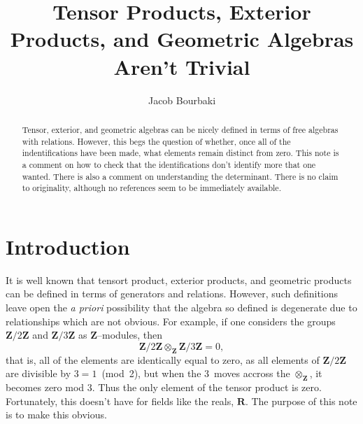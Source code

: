 \documentclass{article}
\title{Tensor Products, Exterior Products, and Geometric Algebras Aren't Trivial}
\author{Jacob Bourbaki}
\begin{document}
\maketitle
\doclicenseThis
\begin{abstract}
Tensor, exterior, and geometric algebras can be nicely defined in terms
of free algebras with relations.  However, this begs the question of whether, once
all of the indentifications have been made, what elements remain distinct from zero.
This note is a comment on how to check that the identifications don't identify more
that one wanted.  There is also a comment on understanding the determinant.  There is
no claim to originality, although no references seem to be immediately available.
\end{abstract}

\section{Introduction}
It is well known that tensort product, exterior products, and geometric products
can be defined in terms of generators and relations.  However, such definitions
leave open the \emph{a priori} possibility that the algebra so defined is degenerate
due to relationships which are not obvious.  For example, if one considers
the groups $\mathbf{Z}/2\mathbf{Z}$ and $\mathbf{Z}/3\mathbf{Z}$ as 
$\mathbf{Z}$--modules, then
\[
  \mathbf{Z}/2\mathbf{Z}  \otimes_{\mathbf{Z}} \mathbf{Z}/3\mathbf{Z}  = 0,
\]
that is, all of the elements are identically equal to zero, as all elements
of $\mathbf{Z}/2\mathbf{Z}$ are divisible by $3=1$~(mod~2), but when the 3~moves
accross the $\otimes_{\mathbf{Z}}$, it becomes zero mod 3.  Thus the only 
element of the tensor product is zero.  Fortunately, this doesn't have for 
fields like the reals, $\mathbf{R}$.  The purpose of this note is to make this
obvious.
\end{document}
